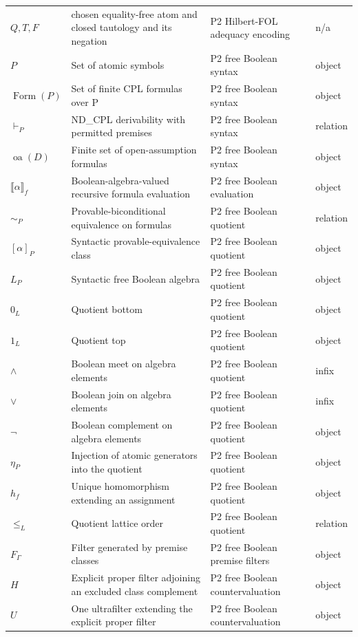 \begin{longtable}{@{}p{}p{}p{}p{}@{}}
\(Q,\allowbreak T,\allowbreak F\) & chosen equality-free atom and closed tautology and its negation & P2 Hilbert-\allowbreak{}FOL adequacy encoding & n/a \\
\(P\) & Set of atomic symbols & P2 free Boolean syntax & object \\
\(\operatorname{Form}(P)\) & Set of finite CPL formulas over P & P2 free Boolean syntax & object \\
\(\vdash_P\) & ND\_CPL derivability with permitted premises & P2 free Boolean syntax & relation \\
\(\operatorname{oa}(D)\) & Finite set of open-assumption formulas & P2 free Boolean syntax & object \\
\(\llbracket\alpha\rrbracket_f\) & Boolean-algebra-valued recursive formula evaluation & P2 free Boolean evaluation & object \\
\(\sim_P\) & Provable-biconditional equivalence on formulas & P2 free Boolean quotient & relation \\
\([\alpha]_P\) & Syntactic provable-equivalence class & P2 free Boolean quotient & object \\
\(L_P\) & Syntactic free Boolean algebra & P2 free Boolean quotient & object \\
\(0_L\) & Quotient bottom & P2 free Boolean quotient & object \\
\(1_L\) & Quotient top & P2 free Boolean quotient & object \\
\(\wedge\) & Boolean meet on algebra elements & P2 free Boolean quotient & infix \\
\(\vee\) & Boolean join on algebra elements & P2 free Boolean quotient & infix \\
\(\neg\) & Boolean complement on algebra elements & P2 free Boolean quotient & object \\
\(\eta_P\) & Injection of atomic generators into the quotient & P2 free Boolean quotient & object \\
\(h_f\) & Unique homomorphism extending an assignment & P2 free Boolean quotient & object \\
\(\leq_L\) & Quotient lattice order & P2 free Boolean quotient & relation \\
\(F_\Gamma\) & Filter generated by premise classes & P2 free Boolean premise filters & object \\
\(H\) & Explicit proper filter adjoining an excluded class complement & P2 free Boolean countervaluation & object \\
\(U\) & One ultrafilter extending the explicit proper filter & P2 free Boolean countervaluation & object \\

\end{longtable}
